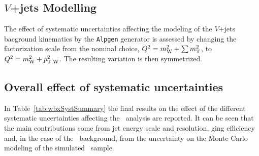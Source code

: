 \subsection{$V$+jets Modelling}

The effect of systematic uncertainties affecting the 
modeling of the $V$+jets bacground kinematics by the \texttt{Alpgen}
generator is assessed by changing the factorization scale from the nominal
choice, $Q^2 =m_{\rm W}^2+\sum m_{\rm T}^2$, to $Q^2 =m_{\rm W}^2+p_{\rm T,W}^2$. 
The resulting variation is then symmetrized.



\subsection{Overall effect of systematic uncertainties}\label{sec:wbxALLSYS}

In Table~\ref{tab:wbxSystSummary} the final results on
the effect of the different systematic uncertainties affecting
the \wbx\ analysis are reported. It can be seen that the main
contributions come from jet energy scale and resolution,
\btag ging efficiency and, in the case of the \ttbar\ 
background, from the uncertainty on the Monte Carlo modeling
of the simulated \ttbar\ sample.


